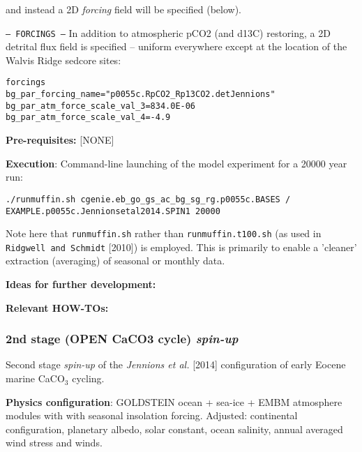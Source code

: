 \documentclass[10pt,twoside]{article}
\begin{document}
\begin{compactitem}
                and instead a 2D \textit{forcing} field will be specified (below).
                \item \texttt{--- FORCINGS ---}
                In addition to atmospheric pCO2 (and d13C) restoring, a 2D detrital flux field is specified -- uniform everywhere except at the location of the Walvis Ridge sedcore sites:
                \vspace{-5pt}\begin{verbatim}forcings
bg_par_forcing_name="p0055c.RpCO2_Rp13CO2.detJennions"
bg_par_atm_force_scale_val_3=834.0E-06
bg_par_atm_force_scale_val_4=-4.9
                \end{verbatim}\vspace{-5pt}
        \end{compactitem}

\noindent \textbf{Pre-requisites:} [NONE]

\noindent \textbf{Execution}: Command-line launching of the model experiment for a 20000 year run:
\vspace{-10pt}\small\begin{verbatim}
./runmuffin.sh cgenie.eb_go_gs_ac_bg_sg_rg.p0055c.BASES / 
EXAMPLE.p0055c.Jennionsetal2014.SPIN1 20000 
\end{verbatim}\normalsize\vspace{-10pt}
Note here that \texttt{runmuffin.sh} rather than \texttt{runmuffin.t100.sh} (as used in \texttt{Ridgwell and Schmidt} [2010]) is employed. This is primarily to enable a 'cleaner' extraction (averaging) of seasonal or monthly data.

\noindent \textbf{Ideas for further development:} 

\noindent \textbf{Relevant HOW-TOs:} 


\subsubsection{2nd stage (OPEN CaCO3 cycle) \textit{spin-up}}\label{EXAMPLE.p0055c.Jennionsetal2014.SPIN2}

Second stage \textsl{spin-up} of the \textit{Jennions et al.} [2014] configuration of early Eocene marine CaCO$_{3}$ cycling.

\noindent \textbf{Physics configuration}: GOLDSTEIN ocean + sea-ice + EMBM atmosphere modules with with seasonal insolation forcing. Adjusted: continental configuration, planetary albedo, solar constant, ocean salinity, annual averaged wind stress and winds.
\end{document}
